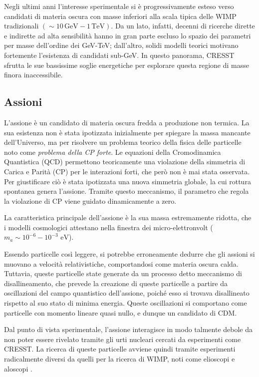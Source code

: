 Negli ultimi anni l'interesse sperimentale si è progressivamente esteso verso candidati di materia oscura con masse inferiori alla scala tipica delle WIMP tradizionali $(\sim 10\,\text{GeV} - 1\,\text{TeV})$. Da un lato, infatti, decenni di ricerche dirette e indirette ad alta sensibilità hanno  in gran parte escluso lo spazio dei parametri per masse dell'ordine dei GeV-TeV; dall'altro, solidi modelli teorici motivano fortemente l'esistenza di candidati sub-GeV. In questo panorama, CRESST sfrutta le sue bassissime soglie energetiche per esplorare questa regione di masse finora inaccessibile.

\subsection{Assioni}
\label{subsec:assioni}

L'assione è un candidato di materia oscura fredda a produzione non termica. La sua esistenza non è stata ipotizzata inizialmente per spiegare la massa mancante dell'Universo, ma per risolvere un problema teorico della fisica delle particelle noto come \textit{problema della CP forte}. Le equazioni della Cromodinamica Quantistica (QCD) permettono teoricamente una violazione della simmetria di Carica e Parità (CP) per le interazioni forti, che però non è mai stata osservata. 
Per giustificare ciò è stata ipotizzata una nuova simmetria globale, la cui rottura spontanea genera l'assione. Tramite questo meccanismo, il parametro che regola la violazione di CP viene guidato dinamicamente a zero.

La caratteristica principale dell'assione è la sua massa estremamente ridotta, che i modelli cosmologici attestano nella finestra dei micro-elettronvolt ($m_a \sim 10^{-6} - 10^{-3} \text{ eV}$).

Essendo particelle così leggere, si potrebbe erroneamente dedurre che gli assioni si muovano a velocità relativistiche, comportandosi come materia oscura calda. Tuttavia, queste particelle state generate da un processo detto meccanismo di disallineamento, che prevede la creazione di queste particelle a partire da oscillazioni del campo quantistico dell'assione, poiché esso si trovava disallineato rispetto al suo stato di minima energia. Queste oscillazioni si comportano come particelle con momento lineare quasi nullo, e dunque un candidato di CDM.

Dal punto di vista sperimentale, l'assione interagisce in modo talmente debole da non poter essere rivelato tramite gli urti nucleari cercati da esperimenti come CRESST. La ricerca di queste particelle avviene quindi tramite esperimenti radicalmente diversi da quelli per la ricerca di WIMP, noti come elioscopi \cite{CAST:2017Nature} e aloscopi \cite{ADMX:2018PRL}.

